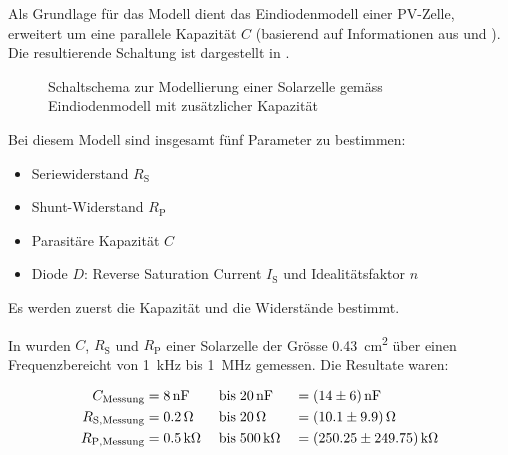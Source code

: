 Als  Grundlage f\"ur  das  Modell dient  das  Eindiodenmodell einer  PV-Zelle,
erweitert  um  eine parallele  Kapazit\"at  $C$  (basierend auf  Informationen
aus \cite{ref:solar:scofield} und \cite{ref:solar:friesen}). Die resultierende
Schaltung ist dargestellt in .

\clearpage
\begin{figure}[h!tb]
    \centering
    
    \caption{%
        Schaltschema    zur    Modellierung    einer    Solarzelle    gem\"ass
        Eindiodenmodell mit zus\"atzlicher Kapazit\"at%
    }
    \label{fig:circuit:solarCell}
\end{figure}

Bei diesem Modell sind insgesamt f\"unf Parameter zu bestimmen:

\begin{itemize}
    \firmlist
    \item
        Seriewiderstand $R_{\mathrm{S}}$
    \item
        Shunt-Widerstand $R_{\mathrm{P}}$
    \item
        Parasit\"are Kapazit\"at $C$
    \item
        Diode   $D$: Reverse    Saturation   Current    $I_{\mathrm{S}}$   und
        Idealit\"atsfaktor $n$
\end{itemize}

Es werden zuerst die Kapazit\"at und die Widerst\"ande bestimmt.

\myfancybreak

In \cite{ref:solar:scofield} wurden $C$, $R_{\mathrm{S}}$ und $R_{\mathrm{P}}$
einer  Solarzelle der  Gr\"osse  \SI{0.43}{\centi\meter\squared} \"uber  einen
Frequenzbereicht von \SI{1}{\kilo\hertz} bis \SI{1}{\mega\hertz} gemessen. Die
Resultate waren:

\begin{alignat}{3}
    \label{eq:scofield:C}
    C_{\mathrm{Messung}}    &= \SI{8}{\nano\farad} \; & \text{bis} \; & \SI{20}{\nano\farad} \;  & = & \; \SI{14 \pm 6}{\nano\farad} \\
    \label{eq:scofield:Rs}
    R_{\mathrm{S, Messung}} &= \SI{0.2}{\ohm}      \; & \text{bis} \; & \SI{20}{\ohm}        \;  & = & \; \SI{10.1 \pm 9.9}{\ohm}     \\
    \label{eq:scofield:Rp}
    R_{\mathrm{P, Messung}} &= \SI{0.5}{\kilo\ohm} \; & \text{bis} \; & \SI{500}{\kilo\ohm}  \;  & = & \; \SI{250.25 \pm 249.75}{\kilo\ohm}
\end{alignat}

